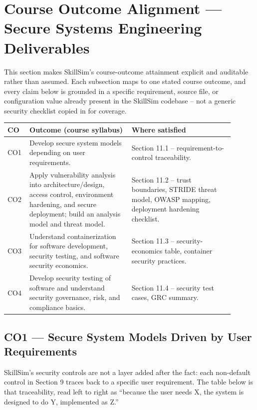 \documentclass[11pt]{article}
\begin{document}
\section{Course Outcome Alignment --- Secure Systems Engineering Deliverables}
\label{sec:co-alignment}

This section makes SkillSim's course-outcome attainment explicit and
auditable rather than assumed. Each subsection maps to one stated
course outcome, and every claim below is grounded in a specific
requirement, source file, or configuration value already present in
the SkillSim codebase -- not a generic security checklist copied in
for coverage.

\begin{center}
\begin{tabular}{@{}p{0.06\linewidth}p{0.42\linewidth}p{0.42\linewidth}@{}}
\toprule
\textbf{CO} & \textbf{Outcome (course syllabus)} & \textbf{Where satisfied} \\
\midrule
CO1 & Develop secure system models depending on user requirements. &
      Section 11.1 -- requirement-to-control traceability. \\
CO2 & Apply vulnerability analysis into architecture/design, access
      control, environment hardening, and secure deployment; build an
      analysis model and threat model. &
      Section 11.2 -- trust boundaries, STRIDE threat model, OWASP
      mapping, deployment hardening checklist. \\
CO3 & Understand containerization for software development, security
      testing, and software security economics. &
      Section 11.3 -- security-economics table, container security
      practices. \\
CO4 & Develop security testing of software and understand security
      governance, risk, and compliance basics. &
      Section 11.4 -- security test cases, GRC summary. \\
\bottomrule
\end{tabular}
\end{center}

\subsection{CO1 --- Secure System Models Driven by User Requirements}

SkillSim's security controls are not a layer added after the fact:
each non-default control in Section 9 traces back to a specific user
requirement. The table below is that traceability, read left to
right as ``because the user needs X, the system is designed to do
Y, implemented as Z.''
\end{document}
